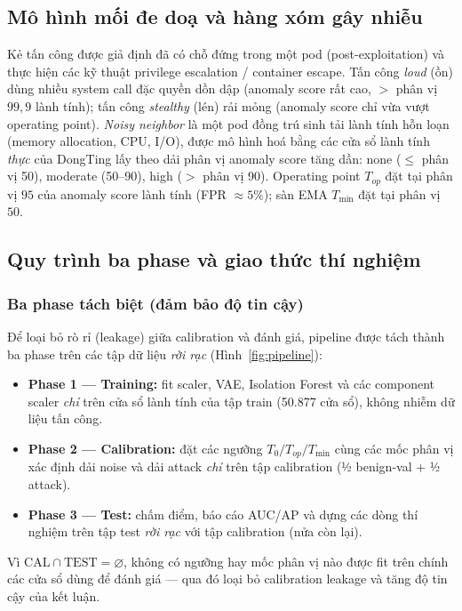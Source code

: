 \subsection{Mô hình mối đe doạ và hàng xóm gây nhiễu}
Kẻ tấn công được giả định đã có chỗ đứng trong một pod (post-exploitation) và thực hiện các kỹ thuật privilege escalation / container escape. Tấn công \textit{loud} (ồn) dùng nhiều system call đặc quyền dồn dập (anomaly score rất cao, $>$ phân vị $99{,}9$ lành tính); tấn công \textit{stealthy} (lén) rải mỏng (anomaly score chỉ vừa vượt operating point). \textit{Noisy neighbor} là một pod đồng trú sinh tải lành tính hỗn loạn (memory allocation, CPU, I/O), được mô hình hoá bằng các cửa sổ lành tính \textit{thực} của DongTing lấy theo dải phân vị anomaly score tăng dần: none ($\le$ phân vị 50), moderate (50--90), high ($>$ phân vị 90). Operating point $T_{op}$ đặt tại phân vị $95$ của anomaly score lành tính (FPR $\approx 5\%$); sàn EMA $T_{\min}$ đặt tại phân vị $50$.

\subsection{Quy trình ba phase và giao thức thí nghiệm}
\subsubsection{Ba phase tách biệt (đảm bảo độ tin cậy)}
Để loại bỏ rò rỉ (leakage) giữa calibration và đánh giá, pipeline được tách thành ba phase trên các tập dữ liệu \textit{rời rạc} (Hình~\ref{fig:pipeline}):
\begin{itemize}[leftmargin=1.2cm]
\item \textbf{Phase 1 — Training:} fit scaler, VAE, Isolation Forest và các component scaler \textit{chỉ} trên cửa sổ lành tính của tập train (50.877 cửa sổ), không nhiễm dữ liệu tấn công.
\item \textbf{Phase 2 — Calibration:} đặt các ngưỡng $T_0/T_{op}/T_{\min}$ cùng các mốc phân vị xác định dải noise và dải attack \textit{chỉ} trên tập calibration (½ benign-val + ½ attack).
\item \textbf{Phase 3 — Test:} chấm điểm, báo cáo AUC/AP và dựng các dòng thí nghiệm trên tập test \textit{rời rạc} với tập calibration (nửa còn lại).
\end{itemize}
Vì $\text{CAL}\cap\text{TEST}=\varnothing$, không có ngưỡng hay mốc phân vị nào được fit trên chính các cửa sổ dùng để đánh giá — qua đó loại bỏ calibration leakage và tăng độ tin cậy của kết luận.

